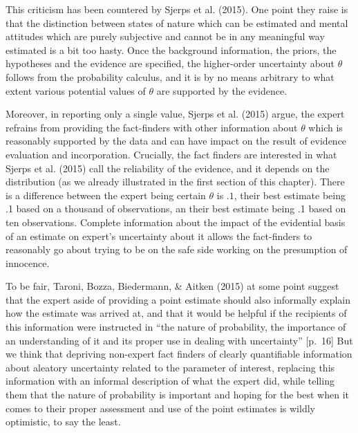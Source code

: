 \documentclass[
  10pt,
  dvipsnames,enabledeprecatedfontcommands]{scrartcl}
\begin{document}
This criticism has been countered by Sjerps et al. (2015). One point
they raise is that the distinction between states of nature which can be
estimated and mental attitudes which are purely subjective and cannot be
in any meaningful way estimated is a bit too hasty. Once the background
information, the priors, the hypotheses and the evidence are specified,
the higher-order uncertainty about \(\theta\) follows from the
probability calculus, and it is by no means arbitrary to what extent
various potential values of \(\theta\) are supported by the evidence.

Moreover, in reporting only a single value, Sjerps et al. (2015) argue,
the expert refrains from providing the fact-finders with other
information about \(\theta\) which is reasonably supported by the data
and can have impact on the result of evidence evaluation and
incorporation. Crucially, the fact finders are interested in what Sjerps
et al. (2015) call the reliability of the evidence, and it depends on
the distribution (as we already illustrated in the first section of this
chapter). There is a difference between the expert being certain
\(\theta\) is \(.1\), their best estimate being .1 based on a thousand
of observations, an their best estimate being .1 based on ten
observations. Complete information about the impact of the evidential
basis of an estimate on expert's uncertainty about it allows the
fact-finders to reasonably go about trying to be on the safe side
working on the presumption of innocence.

To be fair, Taroni, Bozza, Biedermann, \& Aitken (2015) at some point
suggest that the expert aside of providing a point estimate should also
informally explain how the estimate was arrived at, and that it would be
helpful if the recipients of this information were instructed in ``the
nature of probability, the importance of an understanding of it and its
proper use in dealing with uncertainty'' {[}p.~16{]} But we think that
depriving non-expert fact finders of clearly quantifiable information
about aleatory uncertainty related to the parameter of interest,
replacing this information with an informal description of what the
expert did, while telling them that the nature of probability is
important and hoping for the best when it comes to their proper
assessment and use of the point estimates is wildly optimistic, to say
the least.
\end{document}
